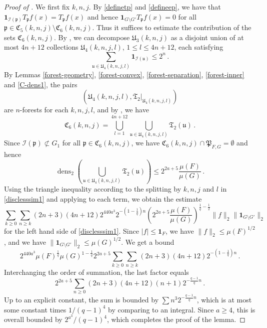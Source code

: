 \documentclass[10pt,a4paper]{article}
\theoremstyle{plain}
\theoremstyle{definition}
\numberwithin{equation}{subsection}
\DeclareMathOperator{\dens}{\operatorname{dens}}
\newcommand{\fp}{{\mathfrak p}}
\newcommand{\fP}{{\mathfrak P}}
\newcommand{\fu}{{\mathfrak u}}
\newcommand{\fU}{{\mathfrak U}}
\newcommand{\fC}{{\mathfrak C}}
\newcommand{\scI}{{\mathcal{I}}} %
\newcommand{\proves}[1]{}
\newcommand{\leanok}{}
\begin{document}
\begin{proof}[Proof of ]
    \proves{forest-union}\leanok

    We first fix $k,n, j$.
    By \eqref{definetp} and \eqref{defineep}, we have that
    $\mathbf{1}_{\scI(\fp)} T_{\fp}f(x) = T_{\fp}f(x)$ and hence $\mathbf{1}_{G \setminus G'} T_{\fp}f(x)= 0$ for all $\fp \in \fC_5(k,n,j) \setminus \fC_6(k,n,j)$.
    Thus it suffices to estimate the contribution of the sets $\fC_6(k,n,j)$. By , we can decompose $\fU_3(k,n,j)$ as a disjoint union of at most $4n + 12$ collections $\fU_4(k,n,j,l)$, $1 \le l \le 4n+12$, each satisfying
    $$
        \sum_{\fu \in \fU_4(k,n,j,l)} \mathbf{1}_{\scI(\fu)} \le 2^n\,.
    $$
    By Lemmas \ref{forest-geometry}, \ref{forest-convex}, \ref{forest-separation}, \ref{forest-inner} and \ref{C-dens1}, the pairs
    $$
        (\fU_4(k,n,j,l), \mathfrak{T}_2|_{\fU_4(k,n,j,l)})
    $$
    are $n$-forests for each $k,n,j,l$, and by , we have
    $$
        \fC_6(k,n,j) = \bigcup_{l = 1}^{4n + 12} \bigcup_{\fu \in \fU_4(k,n,j,l)} \mathfrak{T}_2(\fu)\,.
    $$
    Since $\scI(\fp) \not\subset G_1$ for all $\fp \in \fC_6(k,n,j)$, we have $\fC_6(k,n,j) \cap \fP_{F,G} = \emptyset$ and hence
    $$
        \dens_2(\bigcup_{\fu \in \fU_4(k,n,j,l)} \mathfrak{T}_2(\fu)) \le 2^{2a + 5} \frac{\mu(F)}{\mu(G)}\,.
    $$
    Using the triangle inequality according to the splitting by $k,n,j$ and $l$ in \eqref{disclesssim1} and applying  to each term, we obtain the estimate
    $$
        \sum_{k \ge 0}\sum_{n \ge k} (2n+3)(4n+12) 2^{440a^3}2^{-(1-\frac{1}{q})n}(2^{2a+5} \frac{\mu(F)}{\mu(G)})^{\frac{1}{q} - \frac{1}{2}} \|f\|_2 \|\mathbf{1}_{G\setminus G'}\|_2
    $$
    for the left hand side of \eqref{disclesssim1}. Since $|f| \le \mathbf{1}_F$, we have $\|f\|_2 \le \mu(F)^{1/2}$, and we have $\|\mathbf{1}_{G\setminus G'}\|_2 \le \mu(G)^{1/2}$.
    We get a bound
    $$
        2^{440a^3} \mu(F)^{\frac{1}{q}} \mu(G)^{1
        -\frac{1}{q}} 2^{2a+5}\sum_{k \ge 0}\sum_{n \ge k}(2n+3)(4n+12) 2^{-(1-\frac{1}{q})n}\,.
    $$ %
    Interchanging the order of summation, the last factor equals
    $$
        2^{2a+5} \sum_{n \ge 0} (2n+3)(4n+12) (n+1) 2^{-\frac{q-1}{q}n}\,.
    $$
    Up to an explicit constant, the sum is bounded by $\sum n^3 2^{-\frac{q-1}{q}n}$, which is at most
    some constant times $1/(q-1)^4$ by comparing to an integral. Since $a \ge 4$, this is overall bounded by $2^{a^3}/(q-1)^4$,
    which completes the proof of the lemma.
\end{proof}
\end{document}
